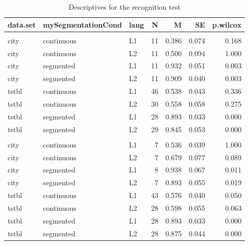 \documentclass[]{article}
\begin{document}
\begin{table}

\caption{\label{tab:recall-recognition-descriptives}Descriptives for the recognition test}
\centering
\begin{tabular}[t]{lllrrrr}
\toprule
data.set & mySegmentationCond & lang & N & M & SE & p.wilcox\\
\midrule
\addlinespace[0.3em]
\multicolumn{7}{l}{\textbf{all}}\\
\hspace{1em}city & continuous & L1 & 11 & 0.386 & 0.074 & 0.168\\
\hspace{1em}city & continuous & L2 & 11 & 0.500 & 0.094 & 1.000\\
\hspace{1em}city & segmented & L1 & 11 & 0.932 & 0.051 & 0.003\\
\hspace{1em}city & segmented & L2 & 11 & 0.909 & 0.040 & 0.003\\
\hspace{1em}tstbl & continuous & L1 & 46 & 0.538 & 0.043 & 0.336\\
\hspace{1em}tstbl & continuous & L2 & 30 & 0.558 & 0.058 & 0.275\\
\hspace{1em}tstbl & segmented & L1 & 28 & 0.893 & 0.033 & \vphantom{1} 0.000\\
\hspace{1em}tstbl & segmented & L2 & 29 & 0.845 & 0.053 & 0.000\\
\addlinespace[0.3em]
\multicolumn{7}{l}{\textbf{>= 50\%}}\\
\hspace{1em}city & continuous & L1 & 7 & 0.536 & 0.039 & 1.000\\
\hspace{1em}city & continuous & L2 & 7 & 0.679 & 0.077 & 0.089\\
\hspace{1em}city & segmented & L1 & 8 & 0.938 & 0.067 & 0.011\\
\hspace{1em}city & segmented & L2 & 7 & 0.893 & 0.055 & 0.019\\
\hspace{1em}tstbl & continuous & L1 & 43 & 0.576 & 0.040 & 0.050\\
\hspace{1em}tstbl & continuous & L2 & 28 & 0.598 & 0.055 & 0.063\\
\hspace{1em}tstbl & segmented & L1 & 28 & 0.893 & 0.033 & 0.000\\
\hspace{1em}tstbl & segmented & L2 & 28 & 0.875 & 0.044 & 0.000\\
\bottomrule
\end{tabular}
\end{table}
\end{document}
